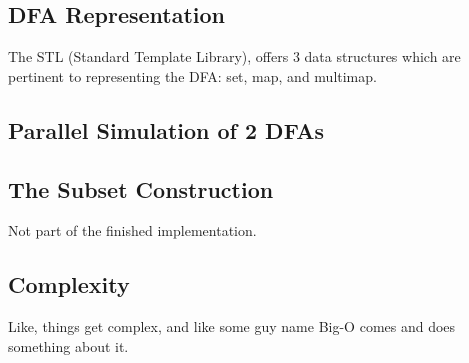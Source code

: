 \documentclass[12pt,journal,compsoc]{IEEEtran}
\begin{document}
\subsection{DFA Representation}
The STL (Standard Template Library), offers 3 data structures which are
pertinent to representing the DFA: set, map, and multimap.  

\subsection{Parallel Simulation of 2 DFAs}

\subsection{The Subset Construction}
Not part of the finished implementation.

\subsection{Complexity}
Like, things get complex, and like some guy name Big-O comes and does something
about it. 
\appendices



\end{document}
